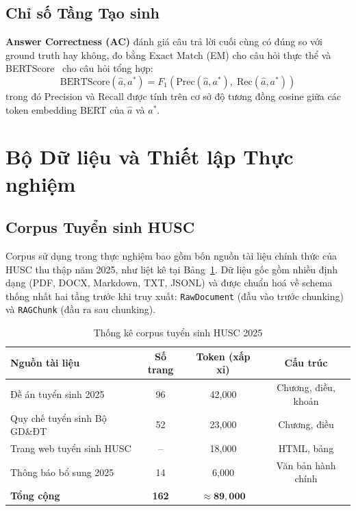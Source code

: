 \documentclass[12pt,a4paper]{report}
\theoremstyle{plain}
\theoremstyle{definition}
\begin{document}
	\subsection{Chỉ số Tầng Tạo sinh}
	\label{subsec:gen_metrics}
	
	\textbf{Answer Correctness (AC)} đánh giá câu trả lời cuối cùng có đúng
	so với ground truth hay không, đo bằng Exact Match (EM) cho câu hỏi thực
	thể và BERTScore~\cite{zhang2020bertscore} cho câu hỏi tổng hợp:
	\begin{equation}
		\text{BERTScore}(\hat{a}, a^*) =
		F_1\!\left(\text{Prec}(\hat{a}, a^*),\;
		\text{Rec}(\hat{a}, a^*)\right)
		\label{eq:bertscore}
	\end{equation}
	trong đó Precision và Recall được tính trên cơ sở độ tương đồng cosine
	giữa các token embedding BERT của $\hat{a}$ và $a^*$.
	
	\section{Bộ Dữ liệu và Thiết lập Thực nghiệm}
	\label{sec:dataset}
	
	\subsection{Corpus Tuyển sinh HUSC}
	\label{subsec:corpus}
	
	Corpus sử dụng trong thực nghiệm bao gồm bốn nguồn tài liệu chính thức
	của HUSC thu thập năm 2025, như liệt kê tại Bảng~\ref{tab:corpus_stats}.
	Dữ liệu gốc gồm nhiều định dạng (PDF, DOCX, Markdown, TXT, JSONL) và được
	chuẩn hoá về schema thống nhất hai tầng trước khi truy xuất: \texttt{RawDocument}
	(đầu vào trước chunking) và \texttt{RAGChunk} (đầu ra sau chunking).
	
	\begin{table}[htbp]
		\centering
		\caption{Thống kê corpus tuyển sinh HUSC 2025}
		\label{tab:corpus_stats}
		\begin{tabular}{lccc}
			\toprule
			\textbf{Nguồn tài liệu} & \textbf{Số trang} & \textbf{Token (xấp xỉ)}
			& \textbf{Cấu trúc} \\
			\midrule
			Đề án tuyển sinh 2025 & 96  & 42,000  & Chương, điều, khoản \\
			Quy chế tuyển sinh Bộ GD\&ĐT & 52 & 23,000 & Chương, điều \\
			Trang web tuyển sinh HUSC & -- & 18,000  & HTML, bảng \\
			Thông báo bổ sung 2025 & 14 & 6,000  & Văn bản hành chính \\
			\midrule
			\textbf{Tổng cộng} & \textbf{162} & $\mathbf{\approx 89{,}000}$ & \\
			\bottomrule
		\end{tabular}
	\end{table}
	
\end{document}
